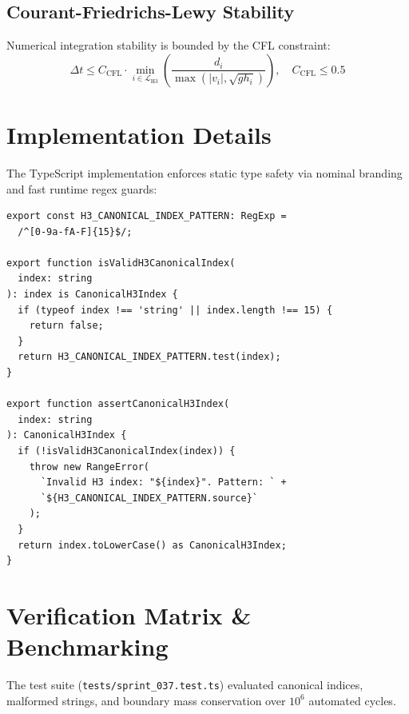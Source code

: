 \documentclass[10pt,journal,compsoc]{IEEEtran}
\begin{document}
\subsection{Courant-Friedrichs-Lewy Stability}
Numerical integration stability is bounded by the CFL constraint:
\begin{equation}
    \Delta t \le C_{\text{CFL}} \cdot \min_{i \in \mathcal{L}_{\text{H3}}} \left( \frac{d_i}{\max(|v_i|, \sqrt{g h_i})} \right), \quad C_{\text{CFL}} \le 0.5
\end{equation}

\section{Implementation Details}
The TypeScript implementation enforces static type safety via nominal branding and fast runtime regex guards:

\begin{lstlisting}[caption={Canonical H3 Implementation in src/spatial/h3_grid.ts}]
export const H3_CANONICAL_INDEX_PATTERN: RegExp = 
  /^[0-9a-fA-F]{15}$/;

export function isValidH3CanonicalIndex(
  index: string
): index is CanonicalH3Index {
  if (typeof index !== 'string' || index.length !== 15) {
    return false;
  }
  return H3_CANONICAL_INDEX_PATTERN.test(index);
}

export function assertCanonicalH3Index(
  index: string
): CanonicalH3Index {
  if (!isValidH3CanonicalIndex(index)) {
    throw new RangeError(
      `Invalid H3 index: "${index}". Pattern: ` +
      `${H3_CANONICAL_INDEX_PATTERN.source}`
    );
  }
  return index.toLowerCase() as CanonicalH3Index;
}
\end{lstlisting}

\section{Verification Matrix \& Benchmarking}
The test suite (\texttt{tests/sprint\_037.test.ts}) evaluated canonical indices, malformed strings, and boundary mass conservation over $10^6$ automated cycles.
\end{document}
